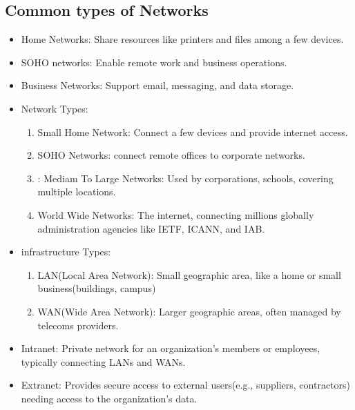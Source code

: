 \documentclass[a4paper,11pt]{article}
\begin{document}
\subsection{Common types of Networks}
\begin{itemize}
    \item Home Networks: Share resources like printers and files among a few devices.\\
    \item SOHO networks: Enable remote work and business operations.\\
    \item Business Networks: Support email, messaging, and data storage.\\
    \item Network Types:\\
    \begin{enumerate}
        \item Small Home Network: Connect a few devices and provide internet access.\\
        \item SOHO Networks: connect remote offices to corporate networks.\\
        \item: Mediam To Large Networks: Used by corporations, schools, covering multiple locations.\\
        \item World Wide Networks: The internet, connecting millions globally administration agencies like IETF, ICANN, and IAB.\\
    \end{enumerate}
    \item infrastructure Types:\\
    \begin{enumerate}
        \item LAN(Local Area Network): Small geographic area, like a home or small business(buildings, campus)\\
        \item WAN(Wide Area Network): Larger geographic areas, often managed by telecoms providers.\\
    \end{enumerate}
    \item Intranet: Private network for an organization's members or employees, typically connecting LANs and WANs.\\
    \item Extranet: Provides secure access to external users(e.g., suppliers, contractors) needing access to the organization's data.\\
\end{itemize}
\end{document}
